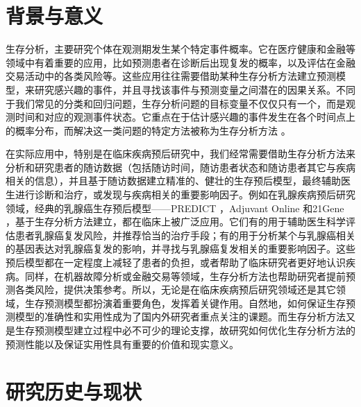 \thesischapterexordium

\section{背景与意义}

生存分析，主要研究个体在观测期发生某个特定事件概率。它在医疗健康和金融等领域中有着重要的应用，比如预测患者在诊断后出现复发的概率，以及评估在金融交易活动中的各类风险等。这些应用往往需要借助某种生存分析方法建立预测模型，来研究感兴趣的事件，并且寻找该事件与预测变量之间潜在的因果关系。不同于我们常见的分类和回归问题，生存分析问题的目标变量不仅仅只有一个，而是观测时间和对应的观测事件状态。它重点在于估计感兴趣的事件发生在各个时间点上的概率分布，而解决这一类问题的特定方法被称为生存分析方法 。

在实际应用中，特别是在临床疾病预后研究中，我们经常需要借助生存分析方法来分析和研究患者的随访数据（包括随访时间，随访患者状态和随访患者其它与疾病相关的信息），并且基于随访数据建立精准的、健壮的生存预后模型，最终辅助医生进行诊断和治疗，或发现与疾病相关的重要影响因子。例如在乳腺疾病预后研究领域，经典的乳腺癌生存预后模型——PREDICT ，Adjuvant Online  和21Gene ，基于生存分析方法建立，都在临床上被广泛应用。它们有的用于辅助医生科学评估患者乳腺癌复发风险，并推荐恰当的治疗手段；有的用于分析某个与乳腺癌相关的基因表达对乳腺癌复发的影响，并寻找与乳腺癌复发相关的重要影响因子。这些预后模型都在一定程度上减轻了患者的负担，或者帮助了临床研究者更好地认识疾病。同样，在机器故障分析或金融交易等领域，生存分析方法也帮助研究者提前预测各类风险，提供决策参考。所以，无论是在临床疾病预后研究领域还是其它领域，生存预测模型都扮演着重要角色，发挥着关键作用。自然地，如何保证生存预测模型的准确性和实用性成为了国内外研究者重点关注的课题。而生存分析方法又是生存预测模型建立过程中必不可少的理论支撑，故研究如何优化生存分析方法的预测性能以及保证实用性具有重要的价值和现实意义。

\section{研究历史与现状}

